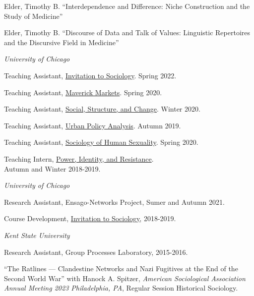 \documentclass[11pt,article,oneside]{memoir}
\begin{document}
\ind Elder, Timothy B. ``Interdependence and Difference: Niche Construction and the Study of Medicine'' \vspace{0.05in}

\ind Elder, Timothy B. ``Discourse of Data and Talk of Values: Linguistic Repertoires and the Discursive Field in Medicine'' \vspace{0.05in}

\bigskip

\medskip
\noindent\emph{University of Chicago \vspace{0.01in}}

\ind Teaching Assistant, \underline{Invitation to Sociology}. Spring 2022.

\ind Teaching Assistant, \underline{Maverick Markets}. Spring 2020.

\ind Teaching Assistant, \underline{Social, Structure, and Change}. Winter 2020.

\ind Teaching Assistant, \underline{Urban Policy Analysis}. Autumn 2019.

\ind Teaching Assistant, \underline{Sociology of Human Sexuality}. Spring 2020.

\ind Teaching Intern, \underline{Power, Identity, and Resistance}. \\ Autumn and Winter 2018-2019.

\bigskip

\medskip
\noindent\emph{University of Chicago \vspace{0.01in}}

\ind Research Assistant, Ensago-Networks Project, Sumer and Autumn 2021. \vspace{0.05in}

\ind Course Development, \underline{Invitation to Sociology}, 2018-2019. \vspace{0.05in}

\smallskip
\noindent\emph{Kent State University \vspace{0.01in}}

\ind Research Assistant, Group Processes Laboratory, 2015-2016. \vspace{0.1in}

\normalsize

\bigskip

\medskip

\ind ``The Ratlines --- Clandestine Networks and Nazi Fugitives at the End of the Second World War'' with Hanock A. Spitzer, \emph{American Sociological Association Annual Meeting 2023 Philadelphia, PA}, Regular Session Historical Sociology. \vspace{0.05in}
\end{document}

